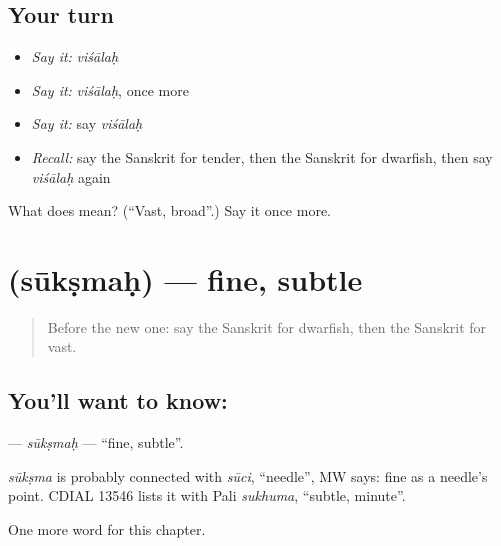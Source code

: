 \subsection*{Your turn}
\begin{itemize}
\raggedright
  \item \emph{Say it:} \emph{viśālaḥ}
  \item \emph{Say it:} \emph{viśālaḥ}, once more
  \item \emph{Say it:} say \emph{viśālaḥ}
  \item \emph{Recall:} say the Sanskrit for tender, then the Sanskrit for dwarfish, then say \emph{viśālaḥ} again
\end{itemize}

\begin{tcolorbox}[breakable,colback=teal!4,colframe=teal!35!black,title={Before you move on}]
What does  mean? (\textquotedblleft{}Vast, broad\textquotedblright{}.) Say it once more.
\end{tcolorbox}
\section[\texorpdfstring{\sk{सूक्ष्मः} (sūkṣmaḥ)}{सूक्ष्मः (sūkṣmaḥ)}]{ (sūkṣmaḥ) — fine, subtle}

\label{lesson:SA-C186-suksmah}



\begin{quote}
Before the new one: say the Sanskrit for dwarfish, then the Sanskrit for vast.
\end{quote}

\subsection*{You'll want to know: }
\textbf{} — \emph{sūkṣmaḥ} — \textquotedblleft{}fine, subtle\textquotedblright{}.

\begin{cousinweb}
\emph{sūkṣma} is probably connected with \emph{sūci}, \textquotedblleft{}needle\textquotedblright{}, MW says: fine as a needle's point. CDIAL 13546 lists it with Pali \emph{sukhuma}, \textquotedblleft{}subtle, minute\textquotedblright{}.
\end{cousinweb}

\begin{grammarlens}[title={What you've built}]
One more word for this chapter.
\end{grammarlens}


